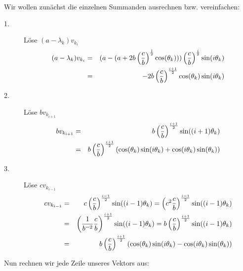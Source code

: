 Wir wollen zunächst die einzelnen Summanden ausrechnen bzw. vereinfachen:

\begin{description}
\item[1.] Löse $(a - \lambda_{k}) v_{k_{i}}$
\begin{eqnarray}
(a - \lambda_{k}) v_{k_{i}} &=& (a - (a + 2b\left(\frac{c}{b}\right)^{\frac{1}{2}} \cos(\theta_{k}))) \left(\frac{c}{b}\right)^{\frac{i}{2}} \sin(i \theta_{k})\notag \\
&=& -2b\left(\frac{c}{b}\right)^{\frac{i+1}{2}} \cos(\theta_{k})\sin(i \theta_{k}) \notag
\end{eqnarray}
\item[2.] Löse $b v_{k_{i+1}}$
\begin{eqnarray}
b v_{k_{i+1}} &=& b \left(\frac{c}{b}\right)^{\frac{i+1}{2}} \sin((i+1) \theta_{k})\notag \\
&=& b \left(\frac{c}{b}\right)^{\frac{i+1}{2}} (\cos(\theta_{k}) \sin(i \theta_{k}) + \cos(i \theta_{k}) \sin(\theta_{k})) \notag
\end{eqnarray}
\item[3.] Löse $c v_{k_{i-1}}$
\begin{eqnarray}
c v_{k_{i-1}} &=& c \left(\frac{c}{b}\right)^{\frac{i-1}{2}} \sin((i-1) \theta_{k}) = \left(c^{2}\frac{c}{b}\right)^{\frac{i-1}{2}} \sin((i-1) \theta_{k})\notag \\
&=& \left(\frac{1}{b^{-2}} \frac{c}{b}\right)^{\frac{i+1}{2}} \sin((i-1) \theta_{k}) = b \left(\frac{c}{b}\right)^{\frac{i+1}{2}} \sin((i-1) \theta_{k}) \notag \\
&=& b \left(\frac{c}{b}\right)^{\frac{i+1}{2}} (\cos(\theta_{k}) \sin(i \theta_{k}) - \cos(i \theta_{k}) \sin(\theta_{k})) \notag
\end{eqnarray}
\end{description}

Nun rechnen wir jede Zeile unseres Vektors aus:

